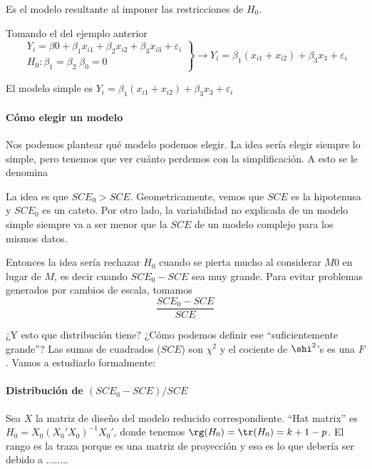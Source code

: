 \begin{defn}
Es el modelo resultante al imponer las restricciones de $H_0$.
\end{defn}
\begin{example}
Tomando el  del ejemplo anterior
\[\left.\begin{array}{c} Y_i = β0 + β_1x_{i1} + β_2x_{i2} +β_3x_{i3} + ε_{i}\\H_0 : β_1 = β_2\; β_0=0\end{array}\right\} \to Y_i = β_1(x_{i1} + x_{i2}) + β_3x_3 + ε_i
\]

El modelo simple es $Y_i = β_1(x_{i1} + x_{i2}) + β_3x_3 + ε_i$
\end{example}

\paragraph{Cómo elegir un modelo}

Nos podemos plantear qué modelo podemos elegir. La idea sería elegir siempre lo simple, pero tenemos que ver cuánto perdemos con la simplificación. A esto se le denomina 


La idea es que $SCE_0 > SCE$. Geometricamente, vemos que $SCE$ es la hipotenusa y $SCE_0$ es un cateto. Por otro lado, la variabilidad no explicada de un modelo simple siempre va a ser menor que la $SCE$ de un modelo complejo para los mismos datos.

Entonces la idea sería rechazar $H_0$ cuando se pierta mucho al considerar $M0$ en lugar de $M$, es decir cuando $SCE_0 - SCE$ sea muy grande. Para evitar problemas generados por cambios de escala, tomamos \[\frac{SCE_0 - SCE}{SCE}\]

¿Y esto que distribución tiene? ¿Cómo podemos definir ese ``suficientemente grande''? Las sumas de cuadrados ($SCE$) son $\chi^2$ y el cociente de $\shi^2$'s es una $F$. Vamos a estudiarlo formalmente:


\paragraph{Distribución de $(SCE_0 - SCE)/SCE$}

Sea $X$ la matriz de diseño del modelo reducido correspondiente. ``Hat matrix'' es $H_0 = X_0(X_0'X_0)^{-1}X_0'$, donde tenemos $\rg(H_0) = \tr(H_0) = k+1-p$. El rango es la traza porque es una matriz de proyección y eso es lo que debería ser debido a ........

